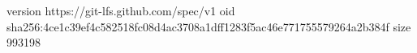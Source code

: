 version https://git-lfs.github.com/spec/v1
oid sha256:4ce1c39ef4c582518fc08d4ac3708a1dff1283f5ac46e771755579264a2b384f
size 993198

